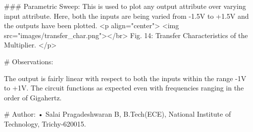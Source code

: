 ### Parametric Sweep:
This is used to plot any output attribute over varying input attribute. Here, both the inputs are being varied from -1.5V to +1.5V and the outputs have been plotted.
<p align="center">
  <img src="images/transfer_char.png"></br>
  Fig. 14: Transfer Characteristics of the Multiplier.
</p>

# Observations:

The output is fairly linear with respect to both the inputs within the range -1V to +1V. The circuit functions as expected even with frequencies ranging in the order of Gigahertz.

# Author:
• Salai Pragadeshwaran B, B.Tech(ECE), National Institute of Technology, Trichy-620015.
